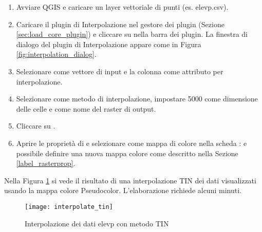 \label{interpolation_usage}

\begin{enumerate}
\item Avviare QGIS e caricare un layer vettoriale di punti (es. elevp.csv).  
  \item Caricare il plugin di Interpolazione nel gestore dei plugin (Sezione
  \ref{sec:load_core_plugin}) e cliccare su  
  nella barra dei plugin. La finestra di dialogo del plugin di Interpolazione appare 
  come in Figura \ref{fig:interpolation_dialog}.
  \item Selezionare  come vettore di input e la colonna 
   come attributo per interpolazione.
  \item Selezionare  come metodo di 
  interpolazione, impostare 5000 come dimensione delle celle e  
  come nome del raster di output.
  \item Cliccare su .
  \item Aprire le proprietà di  e selezionare  come mappa di 
  colore nella scheda : e possibile definire una nuova mappa colore 
  come descritto nella Sezione \ref{label_rasterprop}.
\end{enumerate}

Nella Figura \ref{fig:interpolation_tin} si vede il risultato di una interpolazione TIN 
dei dati  visualizzati usando la mappa colore Pseudocolor. 
L'elaborazione richiede alcuni minuti.

\begin{figure}[ht]
   \centering
   \texttt{[image: interpolate\_tin]}
   \caption{Interpolazione dei dati elevp con metodo TIN \nixcaption}\label{fig:interpolation_tin}
\end{figure}

\FloatBarrier